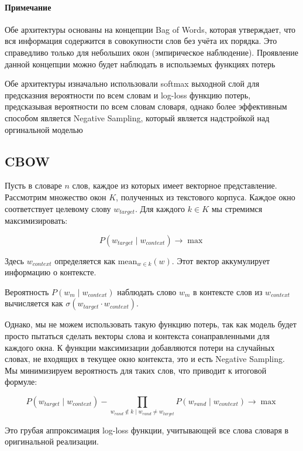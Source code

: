 \documentclass{article}
\begin{document}
    \paragraph*{Примечание}  
    Обе архитектуры основаны на концепции Bag of Words, которая утверждает, что 
    вся информация содержится в совокупности слов без учёта их порядка. Это справедливо только для небольших окон (эмпирическое наблюдение). Проявление 
    данной концепции можно будет наблюдать в использемых функциях потерь

    Обе архитектуры изначально использовали softmax выходной слой для предсказния вероятности по всем словам и log-loss 
    функцию потерь, предсказывая вероятности по всем словам словаря, однако более эффективным способом является Negative Sampling, 
    который является надстройкой над оргинальной моделью

    \subsection{CBOW}  
    Пусть в словаре \( n \) слов, каждое из которых имеет векторное представление. Рассмотрим множество окон \( K \), полученных из текстового корпуса. Каждое окно соответствует целевому слову \( w_{target} \). Для каждого \( k \in K \) мы стремимся максимизировать:  
    
    \[
    P(w_{target} \mid w_{context}) \rightarrow \max
    \]  
    
    Здесь \( w_{context} \) определяется как \( \text{mean}_{w \in k}(w) \). Этот вектор аккумулирует информацию о контексте.  
    
    Вероятность \( P(w_m \mid w_{context}) \) наблюдать слово \( w_m \) в контексте слов из \( w_{context} \) вычисляется как \( \sigma(w_{target} \cdot w_{context}) \).  
    
    Однако, мы не можем использовать такую функцию потерь, так как модель будет просто пытаться сделать векторы слова и контекста сонаправленными для каждого окна. 
    К функции максимизации добавляются потери на случайных словах, не входящих в текущее окно контекста, это и есть Negative Sampling. Мы минимизируем вероятность для таких слов, что приводит к итоговой формуле:  
    
    \[
    P(w_{target} \mid w_{context}) - \prod_{w_{rand} \notin k \mid w_{rand} \neq w_{target}} P(w_{rand} \mid w_{context}) \rightarrow \max
    \]  
    
    Это грубая аппроксимация log-loss функции, учитывающей все слова словаря в оригинальной реализации.  
    
\end{document}
